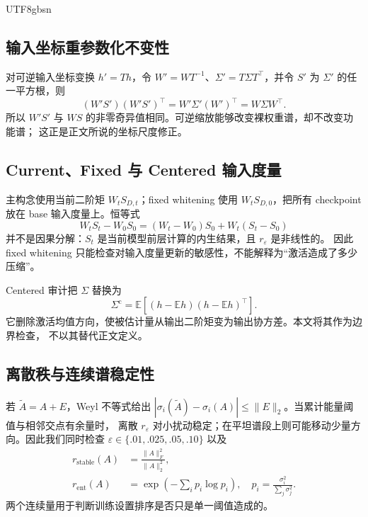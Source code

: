 \documentclass[letterpaper]{article} %
\begin{document}
\begin{CJK*}{UTF8}{gbsn}
\subsection{输入坐标重参数化不变性}

对可逆输入坐标变换 $h'=Th$，令
$W'=WT^{-1}$、$\Sigma'=T\Sigma T^\top$，并令 $S'$ 为 $\Sigma'$ 的任一平方根，则
\begin{equation}
(W'S')(W'S')^\top
=W'\Sigma'(W')^\top
=W\Sigma W^\top.
\end{equation}
所以 $W'S'$ 与 $WS$ 的非零奇异值相同。可逆缩放能够改变裸权重谱，却不改变功能谱；
这正是正文所说的坐标尺度修正。

\subsection{Current、Fixed 与 Centered 输入度量}

主构念使用当前二阶矩 $W_tS_{D,t}$；fixed whitening 使用
$W_tS_{D,0}$，把所有 checkpoint 放在 base 输入度量上。恒等式
\begin{equation}
W_tS_t-W_0S_0
=(W_t-W_0)S_0+W_t(S_t-S_0)
\label{eq:supp-fixed}
\end{equation}
并不是因果分解：$S_t$ 是当前模型前层计算的内生结果，且 $r_\varepsilon$ 是非线性的。
因此 fixed whitening 只能检查对输入度量更新的敏感性，不能解释为“激活造成了多少压缩”。

Centered 审计把 $\Sigma$ 替换为
\begin{equation}
\Sigma^{\mathrm c}
=\mathbb E[(h-\mathbb E h)(h-\mathbb E h)^\top].
\end{equation}
它删除激活均值方向，使被估计量从输出二阶矩变为输出协方差。本文将其作为边界检查，
不以其替代正文定义。

\subsection{离散秩与连续谱稳定性}

若 $\widetilde A=A+E$，Weyl 不等式给出
$|\sigma_i(\widetilde A)-\sigma_i(A)|\le\|E\|_2$。当累计能量阈值与相邻交点有余量时，
离散 $r_\varepsilon$ 对小扰动稳定；在平坦谱段上则可能移动少量方向。因此我们同时检查
$\varepsilon\in\{.01,.025,.05,.10\}$ 以及
\begin{align}
r_{\mathrm{stable}}(A)&=\frac{\|A\|_F^2}{\|A\|_2^2},\\
r_{\mathrm{ent}}(A)&=\exp\left(-\sum_i p_i\log p_i\right),
\quad p_i=\frac{\sigma_i^2}{\sum_j\sigma_j^2}.
\end{align}
两个连续量用于判断训练设置排序是否只是单一阈值造成的。


\end{CJK*}
\end{document}
